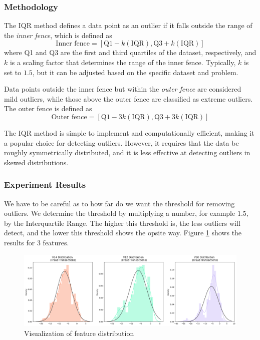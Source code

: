 \subsubsection*{Methodology}

The IQR method defines a data point as an outlier if it falls outside the range of the \textit{inner fence}, which is defined as
\begin{equation}
	\textrm{Inner fence} = [\textrm{Q1} - k(\textrm{IQR}), \textrm{Q3} + k(\textrm{IQR})] 
\end{equation}
where Q1 and Q3 are the first and third quartiles of the dataset, respectively, and $k$ is a scaling factor that determines the range of the inner fence. Typically, $k$ is set to $1.5$, but it can be adjusted based on the specific dataset and problem.

Data points outside the inner fence but within the \textit{outer fence} are considered mild outliers, while those above the outer fence are classified as extreme outliers. The outer fence is defined as
\begin{equation}
	\textrm{Outer fence} = [\textrm{Q1} - 3k(\textrm{IQR}), \textrm{Q3} + 3k(\textrm{IQR})]
\end{equation}

The IQR method is simple to implement and computationally efficient, making it a popular choice for detecting outliers. However, it requires that the data be roughly symmetrically distributed, and it is less effective at detecting outliers in skewed distributions.


\subsubsection*{Experiment Results}

We have to be careful as to how far do we want the threshold for removing outliers. We determine the threshold by multiplying a number, for example $1.5$, by the Interquartile Range. The higher this threshold is, the less outliers will detect, and the lower this threshold shows the opsite way.  Figure \ref{fig:vis_feature} shows the results for 3 features.

\begin{figure}[htbp]
	\centering
	\includegraphics[width=0.7\linewidth]{../output9}
	\caption{Visualization of feature distribution}
	\label{fig:vis_feature}
\end{figure}


